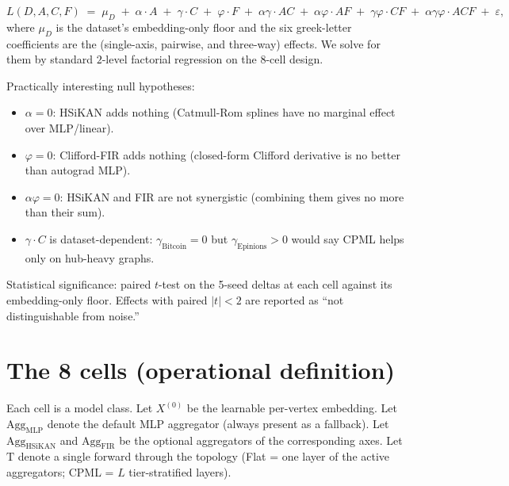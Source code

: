 \documentclass[11pt]{article}
\begin{document}
\[
  L(D, A, C, F)
  \;=\;
  \mu_D \;+\; \alpha \cdot A \;+\; \gamma \cdot C \;+\; \varphi \cdot F
  \;+\; \alpha\gamma \cdot AC \;+\; \alpha\varphi \cdot AF \;+\; \gamma\varphi \cdot CF
  \;+\; \alpha\gamma\varphi \cdot ACF
  \;+\; \varepsilon,
\]
where $\mu_D$ is the dataset's embedding-only floor and the six
greek-letter coefficients are the (single-axis, pairwise, and
three-way) effects. We solve for them by standard
$2$-level factorial regression on the $8$-cell design.

Practically interesting null hypotheses:
\begin{itemize}
  \item $\alpha = 0$: HSiKAN adds nothing (Catmull-Rom splines have
    no marginal effect over MLP/linear).
  \item $\varphi = 0$: Clifford-FIR adds nothing (closed-form
    Clifford derivative is no better than autograd MLP).
  \item $\alpha\varphi = 0$: HSiKAN and FIR are not synergistic
    (combining them gives no more than their sum).
  \item $\gamma \cdot C$ is dataset-dependent: $\gamma_{\text{Bitcoin}} = 0$
    but $\gamma_{\text{Epinions}} > 0$ would say CPML helps only on
    hub-heavy graphs.
\end{itemize}

Statistical significance: paired $t$-test on the 5-seed deltas at
each cell against its embedding-only floor. Effects with paired
$|t| < 2$ are reported as ``not distinguishable from noise.''

\section{The 8 cells (operational definition)}

Each cell is a model class. Let $X^{(0)}$ be the learnable per-vertex
embedding. Let $\mathrm{Agg}_{\text{MLP}}$ denote the default MLP
aggregator (always present as a fallback). Let
$\mathrm{Agg}_{\text{HSiKAN}}$ and $\mathrm{Agg}_{\text{FIR}}$ be
the optional aggregators of the corresponding axes. Let $\mathrm{T}$
denote a single forward through the topology (Flat = one layer of
the active aggregators; CPML = $L$ tier-stratified layers).
\end{document}
